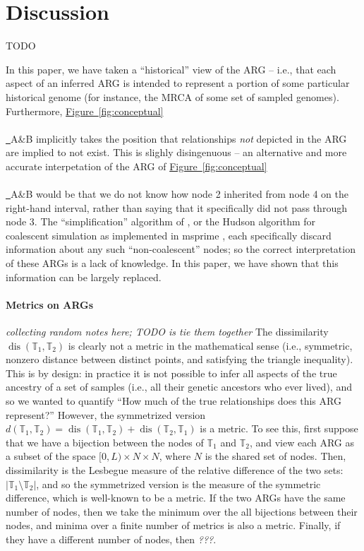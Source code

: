 \documentclass[10pt,twoside,lineno]{gsajnl}
\newcommand{\T}{\mathbb{T}}
\newcommand{\dis}{\operatorname{dis}}
\newcommand{\comment}[1]{{\color{violet} \it #1}}
\newcommand*{\figref}[2][]{%
	\hyperref[{#2}]{%
		Figure~\ref*{#2}%
		\ifx\\#1\\%
		\else
		\,#1%
		\fi
	}%
}
\begin{document}


\section{Discussion}

TODO

In this paper, we have taken a ``historical'' view of the ARG --
i.e., that each aspect of an inferred ARG is intended to represent
a portion of some particular historical genome
(for instance, the MRCA of some set of sampled genomes).
Furthermore, \figref{fig:conceptual}A\&B implicitly takes the position
that relationships \emph{not} depicted in the ARG are implied to not exist.
This is slighly disingenuous -- an alternative and more accurate interpetation
of the ARG of \figref{fig:conceptual}A\&B would be that we do not know
how node 2 inherited from node 4 on the right-hand interval,
rather than saying that it specifically did not pass through node 3.
The ``simplification'' algorithm of \citet{kelleher2018efficient},
or the Hudson algorithm for coalescent simulation
as implemented in msprime \citep{kelleher2016efficient},
each specifically discard information about any such ``non-coalescent'' nodes;
so the correct interpretation of these ARGs is a lack of knowledge.
In this paper, we have shown that this information can be largely replaced.


\paragraph{Metrics on ARGs}
\comment{collecting random notes here; TODO is tie them together}
The dissimilarity $\dis(\T_1,\T_2)$ is clearly not a metric in the mathematical sense
(i.e., symmetric, nonzero distance between distinct points, and satisfying the triangle inequality).
This is by design: in practice it is not possible to infer all aspects
of the true ancestry of a set of samples (i.e., all their genetic ancestors who ever lived),
and so we wanted to quantify
``How much of the true relationships does this ARG represent?''
However, the symmetrized version
$d(\T_1,\T_2) = \dis(\T_1,\T_2) + \dis(\T_2, \T_1)$ is a metric.
To see this, first suppose that we have a bijection between the nodes of $\T_1$ and $\T_2$,
and view each ARG as a subset of the space $[0,L) \times N \times N$,
where $N$ is the shared set of nodes.
Then, dissimilarity is the Lesbegue measure of the relative difference of the two sets:
$|\T_1 \setminus \T_2|$,
and so the symmetrized version is the measure of the symmetric difference,
which is well-known to be a metric.
If the two ARGs have the same number of nodes,
then we take the minimum over the all bijections between their nodes,
and minima over a finite number of metrics is also a metric.
Finally, if they have a different number of nodes,
then \comment{???}.
\end{document}
